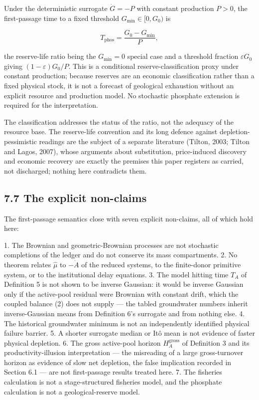 \documentclass[11pt]{article}
\begin{document}
Under the deterministic surrogate \(\dot G = -P\) with constant production \(P > 0\), the first-passage time to a fixed threshold \(G_{\min} \in [0, G_0)\) is 

$$T_{\mathrm{phos}} = \frac{G_0 - G_{\min}}{P},$$

 the reserve-life ratio being the \(G_{\min} = 0\) special case and a threshold fraction \(\varepsilon G_0\) giving \((1-\varepsilon)G_0/\allowbreak{}P\). This is a conditional reserve-classification proxy under constant production; because reserves are an economic classification rather than a fixed physical stock, it is not a forecast of geological exhaustion without an explicit resource and production model. No stochastic phosphate extension is required for the interpretation.

The classification addresses the status of the ratio, not the adequacy of the resource base. The reserve-life convention and its long defence against depletion-pessimistic readings are the subject of a separate literature (Tilton, 2003; Tilton and Lagos, 2007), whose arguments about substitution, price-induced discovery and economic recovery are exactly the premises this paper registers as carried, not discharged; nothing here contradicts them.

\subsection*{7.7 The explicit non-claims}\label{77-the-explicit-non-claims}

The first-passage semantics close with seven explicit non-claims, all of which hold here:

1. The Brownian and geometric-Brownian processes are not stochastic completions of the ledger and do not conserve its mass compartments. 2. No theorem relates \(\widehat\mu\) to \(-\dot A\) of the reduced systems, to the finite-donor primitive system, or to the institutional delay equations. 3. The model hitting time \(T_A\) of Definition 5 is not shown to be inverse Gaussian: it would be inverse Gaussian only if the active-pool residual were Brownian with constant drift, which the coupled balance (2) does not supply --- the tabled groundwater numbers inherit inverse-Gaussian means from Definition 6's surrogate and from nothing else. 4. The historical groundwater minimum is not an independently identified physical failure barrier. 5. A shorter surrogate median or It\^{o} mean is not evidence of faster physical depletion. 6. The gross active-pool horizon \(H_A^{\mathrm{gross}}\) of Definition 3 and its productivity-illusion interpretation --- the misreading of a large gross-turnover horizon as evidence of slow net depletion, the false implication recorded in Section 6.1 --- are not first-passage results treated here. 7. The fisheries calculation is not a stage-structured fisheries model, and the phosphate calculation is not a geological-reserve model.
\end{document}
